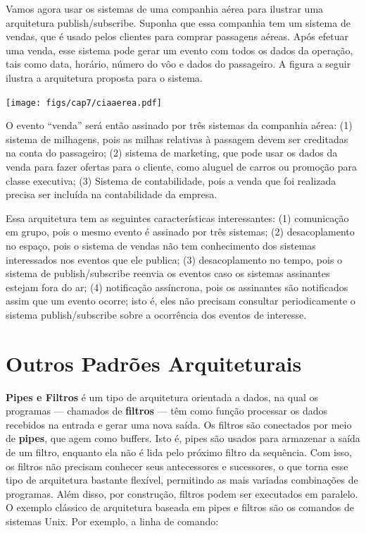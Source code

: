 \documentclass[
  11pt,
  twoside]{book}
\let\origfigure\figure
\let\endorigfigure\endfigure
\renewenvironment{figure}[1][2] {
    \expandafter\origfigure\expandafter[!h]
} {
    \endorigfigure
}
\begin{document}
Vamos agora usar os sistemas de uma companhia aérea para ilustrar uma
arquitetura publish/subscribe. Suponha que essa companhia tem um sistema
de vendas, que é usado pelos clientes para comprar passagens aéreas.
Após efetuar uma venda, esse sistema pode gerar um evento com todos os
dados da operação, tais como data, horário, número do vôo e dados do
passageiro. A figura a seguir ilustra a arquitetura proposta para o
sistema.

\begin{figure}
\centering
\texttt{[image: figs/cap7/ciaaerea.pdf]}
\caption{Arquitetura Pub/Sub em uma companhia aérea}
\end{figure}

O evento ``venda'' será então assinado por três sistemas da companhia
aérea: (1) sistema de milhagens, pois as milhas relativas à passagem
devem ser creditadas na conta do passageiro; (2) sistema de marketing,
que pode usar os dados da venda para fazer ofertas para o cliente, como
aluguel de carros ou promoção para classe executiva; (3) Sistema de
contabilidade, pois a venda que foi realizada precisa ser incluída na
contabilidade da empresa.

Essa arquitetura tem as seguintes características interessantes: (1)
comunicação em grupo, pois o mesmo evento é assinado por três sistemas;
(2) desacoplamento no espaço, pois o sistema de vendas não tem
conhecimento dos sistemas interessados nos eventos que ele publica; (3)
desacoplamento no tempo, pois o sistema de publish/subscribe reenvia os
eventos caso os sistemas assinantes estejam fora do ar; (4) notificação
assíncrona, pois os assinantes são notificados assim que um evento
ocorre; isto é, eles não precisam consultar periodicamente o sistema
publish/subscribe sobre a ocorrência dos eventos de interesse.

\hypertarget{outros-padruxf5es-arquiteturais}{%
\section{Outros Padrões
Arquiteturais}\label{outros-padruxf5es-arquiteturais}}

 

\textbf{Pipes e Filtros} é um tipo de arquitetura orientada a dados, na
qual os programas --- chamados de \textbf{filtros} --- têm como função
processar os dados recebidos na entrada e gerar uma nova saída. Os
filtros são conectados por meio de \textbf{pipes}, que agem como
buffers. Isto é, pipes são usados para armazenar a saída de um filtro,
enquanto ela não é lida pelo próximo filtro da sequência. Com isso, os
filtros não precisam conhecer seus antecessores e sucessores, o que
torna esse tipo de arquitetura bastante flexível, permitindo as mais
variadas combinações de programas. Além disso, por construção, filtros
podem ser executados em paralelo. O exemplo clássico de arquitetura
baseada em pipes e filtros são os comandos de sistemas Unix. Por
exemplo, a linha de comando:
\end{document}
